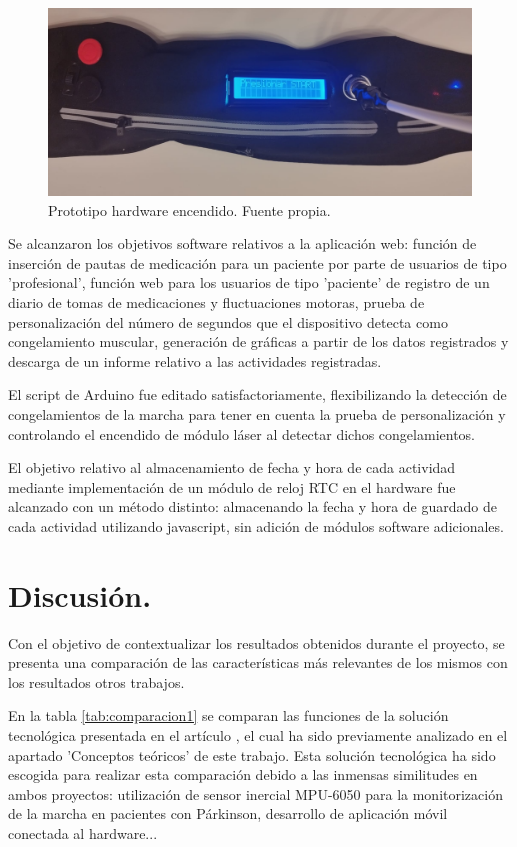 \begin{figure}[h]
    \centering
    \includegraphics[width=1\textwidth]{img/prototipoencendido.jpg}
    \caption{Prototipo hardware encendido. Fuente propia.}
    \label{fig:prototipoencendido}
\end{figure}

Se alcanzaron los objetivos software relativos a la aplicación web: función de inserción de pautas de medicación para un paciente por parte de usuarios de tipo 'profesional', función web para los usuarios de tipo 'paciente' de registro de un diario de tomas de medicaciones y fluctuaciones motoras, prueba de personalización del número de segundos que el dispositivo detecta como congelamiento muscular, generación de gráficas a partir de los datos registrados y descarga de un informe relativo a las actividades registradas.

El script de Arduino fue editado satisfactoriamente, flexibilizando la detección de congelamientos de la marcha para tener en cuenta la prueba de personalización y controlando el encendido de módulo láser al detectar dichos congelamientos.

El objetivo relativo al almacenamiento de fecha y hora de cada actividad mediante implementación de un módulo de reloj RTC en el hardware fue alcanzado con un método distinto: almacenando la fecha y hora de guardado de cada actividad utilizando javascript, sin adición de módulos software adicionales.
\section{Discusión.}
Con el objetivo de contextualizar los resultados obtenidos durante el proyecto, se presenta una comparación de las características más relevantes de los mismos con los resultados otros trabajos.

En la tabla \ref{tab:comparacion1} se comparan las funciones de la solución tecnológica presentada en el artículo \cite{GONCALVES2021115653}, el cual ha sido previamente analizado en el apartado 'Conceptos teóricos' de este trabajo. Esta solución tecnológica ha sido escogida para realizar esta comparación debido a las inmensas similitudes en ambos proyectos: utilización de sensor inercial MPU-6050 para la monitorización de la marcha en pacientes con Párkinson, desarrollo de aplicación móvil conectada al hardware... 


